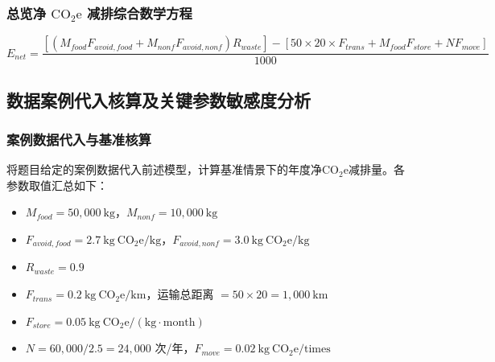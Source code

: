 \documentclass{article}
\begin{document}

\subsubsection{总览净 $\mathrm{CO}_2\mathrm{e}$ 减排综合数学方程}

\begin{equation}
    E_{net} = \frac{\left[ \left( M_{food} F_{avoid, food} + M_{nonf} F_{avoid, nonf} \right) R_{waste} \right] - \left[ 50 \times 20 \times F_{trans} + M_{food} F_{store} + N F_{move} \right]}{1000} \label{eq:final_net}
\end{equation}







\subsection{数据案例代入核算及关键参数敏感度分析}%

\subsubsection{案例数据代入与基准核算}

将题目给定的案例数据代入前述模型，计算基准情景下的年度净$\mathrm{CO_2e}$减排量。各参数取值汇总如下：
\begin{itemize}
    \item $M_{food} = 50{,}000\ \mathrm{kg}$，$M_{nonf} = 10{,}000\ \mathrm{kg}$
    \item $F_{avoid, food} = 2.7\ \mathrm{kg\ CO_2e/kg}$，$F_{avoid, nonf} = 3.0\ \mathrm{kg\ CO_2e/kg}$
    \item $R_{waste} = 0.9$
    \item $F_{trans} = 0.2\ \mathrm{kg\ CO_2e/km}$，运输总距离 $= 50 \times 20 = 1{,}000\ \mathrm{km}$
    \item $F_{store} = 0.05\ \mathrm{kg\ CO_2e/(kg\cdot month)}$
    \item $N = 60{,}000 / 2.5 = 24{,}000$ 次/年，$F_{move} = 0.02\ \mathrm{kg\ CO_2e/times}$
\end{itemize}
\end{document}
